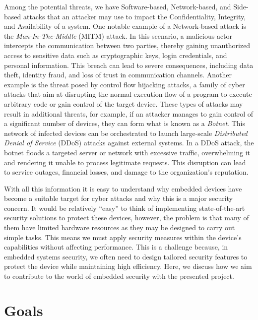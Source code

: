 Among the potential threats, we have Software-based, Network-based, and Side-based
attacks that an attacker may use to impact the Confidentiality, Integrity, and
Availability of a system. One notable example of a Network-based attack is the \textit{Man-In-The-Middle}
(MITM) attack. In this scenario, a malicious actor intercepts the communication
between two parties, thereby gaining unauthorized access to sensitive data such as
cryptographic keys, login credentials, and personal information. This breach can
lead to severe consequences, including data theft, identity fraud, and loss of trust
in communication channels. Another example is the threat posed by control flow
hijacking attacks, a family of cyber attacks that aim at disrupting the normal execution
flow of a program to execute arbitrary code or gain control of the target device.
These types of attacks may result in additional threats, for example, if an
attacker manages to gain control of a significant number of devices, they can form
what is known as a \textit{Botnet}. This network of infected devices can be orchestrated
to launch large-scale \textit{Distributed Denial of Service} (DDoS) attacks
against external systems. In a DDoS attack, the botnet floods a targeted server
or network with excessive traffic, overwhelming it and rendering it unable to process
legitimate requests. This disruption can lead to service outages, financial losses,
and damage to the organization's reputation.

With all this information it is easy to understand why embedded devices have
become a suitable target for cyber attacks and why this is a major security
concern. It would be relatively ``easy'' to think of implementing state-of-the-art
security solutions to protect these devices, however, the problem is that many of
them have limited hardware resources as they may be designed to carry out simple
tasks. This means we must apply security measures within the device's
capabilities without affecting performance. This is a challenge because, in
embedded systems security, we often need to design tailored security features to
protect the device while maintaining high efficiency. Here, we discuss how we aim
to contribute to the world of embedded security with the presented project.

\section{Goals}
\label{sec:intro_goals}

